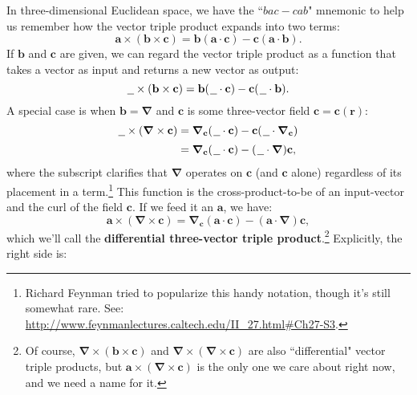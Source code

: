 \documentclass[12pt]{article}
\renewcommand{\vv}[1]{\mathbf{#1}}
\newcommand{\del}{\boldsymbol{\nabla}}
\begin{document}
In three-dimensional Euclidean space, we have the ``$bac - cab$" mnemonic to help us remember how the vector triple product expands into two terms:
\begin{equation*}
\vv a \times (\vv b \times \vv c) = \vv b (\vv a \cdot \vv c) - \vv c (\vv a \cdot \vv b).
\end{equation*}
If $\vv b$ and $\vv c$ are given, we can regard the vector triple product as a function that takes a vector as input and returns a new vector as output:
\begin{equation*}
\text{\underline{\hspace{.6em}}} \times (\vv b \times \vv c) = \vv b ( \mkern1.5mu \text{\underline{\hspace{.6em}}} \cdot \vv c ) - \vv c ( \mkern1.5mu \text{\underline{\hspace{.6em}}} \cdot \vv b ).
\end{equation*}
A special case is when $\vv b = \del$ and $\vv c$ is some three-vector field $\vv c = \vv c (\vv r)$:
\begin{equation}\label{eq:cc}
\begin{split}
\text{\underline{\hspace{.6em}}} \times (\del \times \vv c) &= \del_{\vv c} ( \mkern1.5mu \text{\underline{\hspace{.6em}}} \cdot \vv c ) - \vv c ( \mkern1.5mu \text{\underline{\hspace{.6em}}} \cdot \del_{\vv c} ) \\[2pt]
&= \del_{\vv c} ( \mkern1.5mu \text{\underline{\hspace{.6em}}} \cdot \vv c ) - ( \mkern1.5mu \text{\underline{\hspace{.6em}}} \cdot \del ) \vv c ,
\end{split}
\end{equation}
where the subscript clarifies that $\del$ operates on $\vv c$ (and $\vv c$ alone) regardless of its placement in a term.\footnote{Richard Feynman tried to popularize this handy notation, though it's still somewhat rare. See: \url{http://www.feynmanlectures.caltech.edu/II_27.html\#Ch27-S3}.} This function is the cross-product-to-be of an input-vector and the curl of the field $\vv c$. If we feed it an $\vv a$, we have:
\begin{equation*}
\vv a \times (\del \times \vv c) = \del_{\vv c} ( \vv a \cdot \vv c ) - ( \vv a \cdot \del ) \vv c ,
\end{equation*}
which we'll call the \textbf{differential three-vector triple product}.\footnote{Of course, $\del \times (\vv b \times \vv c)$ and $\del \times (\del \times \vv c)$ are also ``differential" vector triple products, but $\vv a \times (\del \times \vv c)$ is the only one we care about right now, and we need a name for it.} Explicitly, the right side is:
\end{document}
